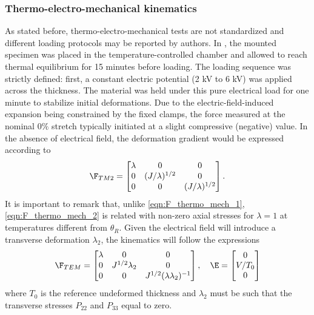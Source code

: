 \subsubsection{Thermo-electro-mechanical kinematics}

As stated before, thermo-electro-mechanical tests are not standardized and different loading protocols may be reported by authors. In \cite{Mehnert2021a}, the mounted specimen was placed in the temperature-controlled chamber and allowed to reach thermal equilibrium for 15 minutes before loading. The loading sequence was strictly defined: first, a constant electric potential (2 kV to 6 kV) was applied across the thickness. The material was held under this pure electrical load for one minute to stabilize initial deformations. Due to the electric-field-induced expansion being constrained by the fixed clamps, the force measured at the nominal $0\%$ stretch typically initiated at a slight compressive (negative) value. In the absence of electrical field, the deformation gradient would be expressed according to
\begin{equation}
  \label{eqn:F_thermo_mech_2}
  \F_{TM2} = \begin{bmatrix}
    \lambda & 0 & 0 \\
    0 & (J/\lambda)^{1/2} & 0 \\
    0 & 0 & (J/\lambda)^{1/2} \\
  \end{bmatrix} .
\end{equation}
It is important to remark that, unlike \eqref{eqn:F_thermo_mech_1}, \eqref{eqn:F_thermo_mech_2} is related with non-zero axial stresses for $\lambda=1$ at temperatures different from $\theta_R$. Given the electrical field will introduce a transverse deformation $\lambda_2$, the kinematics will follow the expressions
\begin{equation}
  \label{eqn:F_thermo_electro_mech}
  \F_{TEM} = \begin{bmatrix}
    \lambda & 0 & 0 \\
    0 & J^{1/2}\lambda_2 & 0 \\
    0 & 0 & J^{1/2}(\lambda\lambda_2)^{-1} \\
  \end{bmatrix} , \quad
  \E = \begin{bmatrix} 0 \\ V/T_0 \\ 0 \end{bmatrix}
\end{equation}
where $T_0$ is the reference undeformed thickness and $\lambda_2$ must be such that the transverse stresses $P_{22}$ and $P_{33}$ equal to zero.



